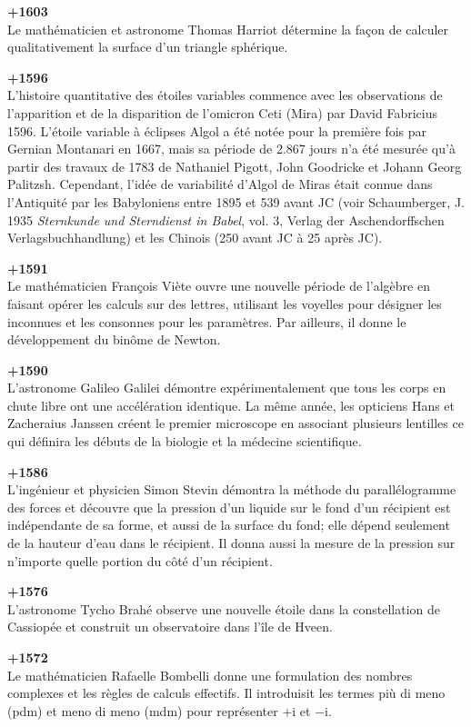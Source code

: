 \textbf{+1603}\\
Le mathématicien et astronome Thomas Harriot détermine la façon de calculer qualitativement la surface d'un triangle sphérique.

\textbf{+1596}\\
L'histoire quantitative des étoiles variables commence avec les observations de l'apparition et de la disparition de l'omicron Ceti (Mira) par David Fabricius 1596. L'étoile variable à éclipses Algol a été notée pour la première fois par Gernian Montanari en 1667, mais sa période de 2.867 jours n'a été mesurée qu'à partir des travaux de 1783 de Nathaniel Pigott, John Goodricke et Johann Georg Palitzsh. Cependant, l'idée de variabilité d'Algol de Miras était connue dans l'Antiquité par les Babyloniens entre 1895 et 539 avant JC (voir Schaumberger, J. 1935 \textit{Sternkunde und Sterndienst in Babel}, vol. 3, Verlag der Aschendorffschen Verlagsbuchhandlung) et les Chinois (250 avant JC à 25 après JC).

\textbf{+1591}\\
Le mathématicien François Viète ouvre une nouvelle période de l'algèbre en faisant opérer les calculs sur des lettres, utilisant les voyelles pour désigner les inconnues et les consonnes pour les paramètres. Par ailleurs, il donne le développement du binôme de Newton.

\textbf{+1590}\\
L'astronome Galileo Galilei démontre expérimentalement que tous les corps en chute libre ont une accélération identique. La même année, les opticiens Hans et Zacheraius Janssen créent le premier microscope en associant plusieurs lentilles ce qui définira les débuts de la biologie et la médecine scientifique.

\textbf{+1586}\\
L'ingénieur et physicien Simon Stevin démontra la méthode du parallélogramme des forces et découvre que la pression d'un liquide sur le fond d'un récipient est indépendante de sa forme, et aussi de la surface du fond; elle dépend seulement de la hauteur d'eau dans le récipient. Il donna aussi la mesure de la pression sur n'importe quelle portion du côté d’un récipient.

\textbf{+1576}\\
L'astronome Tycho Brahé observe une nouvelle étoile dans la constellation de Cassiopée et construit un observatoire dans l'île de Hveen.

\textbf{+1572}\\
Le mathématicien Rafaelle Bombelli donne une formulation des nombres complexes et les règles de calculs effectifs.  Il introduisit les termes più di meno (pdm) et meno di meno (mdm) pour représenter $+\mathrm{i}$ et $-\mathrm{i}$.

